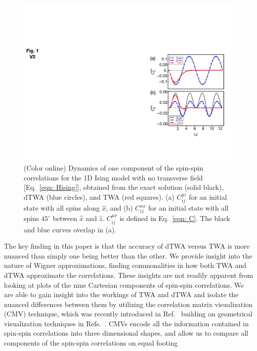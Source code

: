 \documentclass[pra,reprint,superscriptaddress]{revtex4-1}
\begin{document}
\begin{figure}[t]\centering
\includegraphics[width = 0.7\columnwidth]{fig1v2.pdf}
\caption{(Color online) Dynamics of one component of the spin-spin correlations for the 1D Ising model with no transverse field [Eq.~\eqref{eqn: Hising}], obtained from the exact solution (solid black), dTWA (blue circles), and TWA (red squares). (a) $C_{ij}^{yz}$ for an initial state with all spins along $\hat x$, and (b) $C_{ij}^{xx}$ for an initial state with all spins $45^\circ$ between $\hat x$ and $\hat z$. $C^{\mu\nu}_{ij}$ is defined in Eq.~\eqref{eqn: C}. The black and blue curves overlap in (a).}
\label{fig: correlation2}
\end{figure}

The key finding in this paper is that the accuracy of dTWA versus TWA is more nuanced than simply one being better than the other. We provide insight into the nature of Wigner approximations, finding commonalities in how both TWA and dTWA approximate the correlations. These insights are not readily apparent from looking at plots of the nine Cartesian components of spin-spin correlations. We are able to gain insight into the workings of TWA and dTWA and isolate the nuanced differences between them by utilizing the correlation matrix visualization (CMV) technique, which was recently introduced in Ref.~\cite{mukherjee2018geometric} building on geometrical visualization techniques in Refs.~\cite{kimura2003bloch, byrd2003characterization, jakobczyk2001geometry, tilma2002parametrization, rundle2017simple, bertlmann2008bloch, giraud2015tensor, jevtic2014quantum, dunkl2011numerical, kurzynski2016three, sorensen1984product, halstead1984multipole, donne1997pictorial, philp2005way, merkel2008quantum, dowling1994wigner, harland2012towards, gamel2016entangled, garon2015visualizing, leiner2017wigner}. CMVs encode all the information contained in spin-spin correlations into three dimensional shapes, and allow us to compare all components of the spin-spin correlations on equal footing
\end{document}
